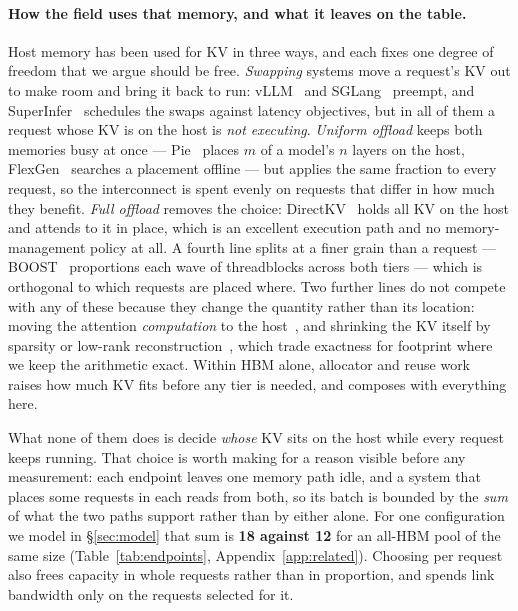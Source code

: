 \paragraph{How the field uses that memory, and what it leaves on the table.}
Host memory has been used for KV in three ways, and each fixes one degree of freedom
that we argue should be free. \emph{Swapping} systems move a request's KV out to make
room and bring it back to run: vLLM~\cite{vllm} and SGLang~\cite{sglang} preempt,
and SuperInfer~\cite{superinfer} schedules the swaps against latency objectives, but
in all of them a request whose KV is on the host is \emph{not executing}.
\emph{Uniform offload} keeps both memories busy at once --- Pie~\cite{pie} places
$m$ of a model's $n$ layers on the host, FlexGen~\cite{flexgen} searches a placement
offline --- but applies the same fraction to every request, so the interconnect is
spent evenly on requests that differ in how much they benefit. \emph{Full offload}
removes the choice: DirectKV~\cite{directkv} holds all KV on the host and attends to
it in place, which is an excellent execution path and no memory-management policy at
all. A fourth line splits at a finer grain than a request --- BOOST~\cite{boost}
proportions each wave of threadblocks across both tiers --- which is orthogonal to
which requests are placed where. Two further lines do not compete with any of these
because they change the quantity rather than its location: moving the attention
\emph{computation} to the host~\cite{neo}, and shrinking the KV itself by sparsity
or low-rank reconstruction~\cite{shadowkv,infinigen}, which trade exactness for
footprint where we keep the arithmetic exact. Within HBM alone, allocator and reuse
work~\cite{vllm,vattention,cachedattention} raises how much KV fits before any tier
is needed, and composes with everything here.

What none of them does is decide \emph{whose} KV sits on the host while every
request keeps running. That choice is worth making for a reason visible before any
measurement: each endpoint leaves one memory path idle, and a system that places
some requests in each reads from both, so its batch is bounded by the \emph{sum} of
what the two paths support rather than by either alone. For one configuration we
model in \S\ref{sec:model} that sum is \textbf{18 against 12} for an all-HBM pool
of the same size (Table~\ref{tab:endpoints}, Appendix~\ref{app:related}). Choosing per request also frees capacity in whole requests
rather than in proportion, and spends link bandwidth only on the requests selected
for it.

